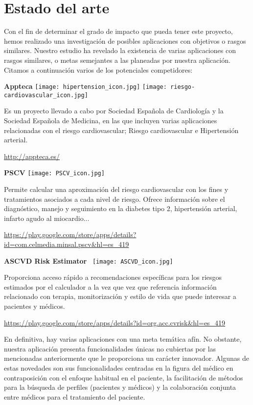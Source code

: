 \documentclass[11pt,spanish,
		listoftables,listoffigures]
		{tfgplantilla}
\begin{document}
\section{Estado del arte}

Con el fin de determinar el grado de impacto que pueda tener este proyecto, hemos realizado una investigación de posibles aplicaciones con objetivos o rasgos similares. Nuestro estudio ha revelado la existencia de varias aplicaciones con rasgos similares, o metas semejantes a las planeadas por nuestra aplicación. Citamos a continuación varios de los potenciales competidores:

\noindent
\textbf {Appteca }
\texttt{[image: hipertension\_icon.jpg]}
\texttt{[image: riesgo-cardiovascular\_icon.jpg]}  

\noindent
Es un  proyecto llevado a cabo por Sociedad Española de Cardiología y la Sociedad Española de Medicina, en las que incluyen varias aplicaciones relacionadas con el riesgo cardiovascular; Riesgo cardiovascular e Hipertensión arterial.

\noindent \url{http://appteca.es/}

\noindent
\textbf {PSCV}
\texttt{[image: PSCV\_icon.jpg]}

\noindent
Permite calcular una aproximación del riesgo cardiovascular con los fines y tratamientos asociados a cada nivel de riesgo. Ofrece información sobre el diagnóstico, manejo y seguimiento en la diabetes tipo 2, hipertensión arterial, infarto agudo al miocardio...

\noindent \url{https://play.google.com/store/apps/details?id=com.celmedia.minsal.pscv&hl=es_419} 

\noindent
\textbf {ASCVD Risk Estimator}
\ \texttt{[image: ASCVD\_icon.jpg]}

\noindent
Proporciona acceso rápido a recomendaciones específicas para los riesgos estimados por el calculador a la vez que vez que referencia información relacionado con terapia, monitorización y estilo de vida que puede interesar a pacientes y médicos.

\noindent \url{https://play.google.com/store/apps/details?id=org.acc.cvrisk&hl=es_419}

En definitiva, hay varias aplicaciones con una meta temática afín. No obstante, nuestra aplicación presenta funcionalidades únicas no cubiertas por las mencionadas anteriormente que le proporciona un carácter innovador. 
Algunas de estas novedades son sus funcionalidades centradas en la figura del médico en contraposición con el enfoque habitual en el paciente, la facilitación de métodos para la búsqueda de perfiles (pacientes y médicos) y la colaboración conjunta entre médicos para el tratamiento del paciente.
\end{document}
